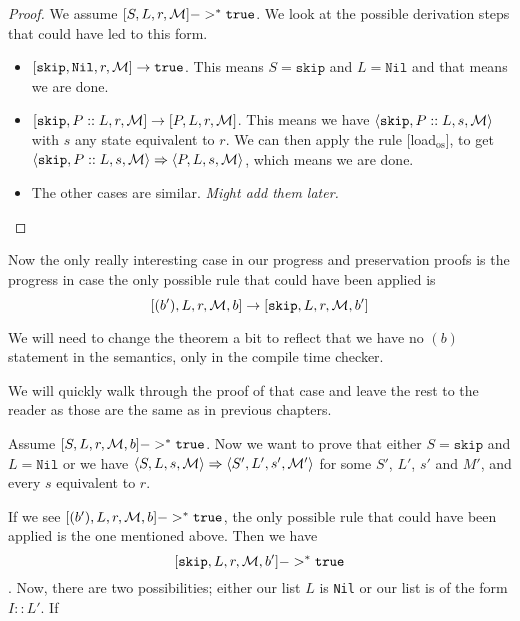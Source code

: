 \begin{proof}
We assume $[ S, L, r, \mathcal{M} ] ->^* \texttt{true}$. We look at the possible derivation steps that could have led to this form. 
\begin{itemize}[noitemsep]
    \item $[ \texttt{skip}, \texttt{Nil}, r, \mathcal{M} ] \to \texttt{true}$. This means $S = \texttt{skip}$ and $L = \texttt{Nil}$ and that means we are done.
    \item $[ \texttt{skip}, P::L, r, \mathcal{M} ] \to [ P, L, r, \mathcal{M} ]$. This means we have $\langle \texttt{skip}, P::L, s, \mathcal{M} \rangle$ with $s$ any state equivalent to $r$. We can then apply the rule [load$_{\textrm{os}}$], to get $\langle \texttt{skip}, P::L, s, \mathcal{M} \rangle \Rightarrow \langle P, L, s, \mathcal{M} \rangle$, which means we are done.
    \item The other cases are similar. \emph{Might add them later.}
\end{itemize}
\end{proof}



Now the only really interesting case in our progress and preservation proofs is the progress in case the only possible rule that could have been applied is 
$$[ (b'), L, r, \mathcal{M}, b ]  \to [ \texttt{skip}, L, r, \mathcal{M}, b' ]$$

We will need to change the theorem a bit to reflect that we have no $(b)$ statement in the semantics, only in the compile time checker. 

We will quickly walk through the proof of that case and leave the rest to the reader as those are the same as in previous chapters. 

Assume $[ S, L, r, \mathcal{M}, b ] ->^* \texttt{true}$. Now we want to prove that either $S = \texttt{skip}$ and $L = \texttt{Nil}$ or we have $\langle S, L, s, \mathcal{M} \rangle \Rightarrow \langle S', L', s', \mathcal{M'} \rangle$ for some $S'$, $L'$, $s'$ and $M'$, and every $s$ equivalent to $r$.

If we see $[ (b'), L, r, \mathcal{M}, b ] ->^* \texttt{true}$, the only possible rule that could have been applied is the one mentioned above. Then we have
$$[ \texttt{skip}, L, r, \mathcal{M}, b' ] ->^* \texttt{true}$$.
Now, there are two possibilities; either our list $L$ is \texttt{Nil} or our list is of the form $I::L'$. If 
